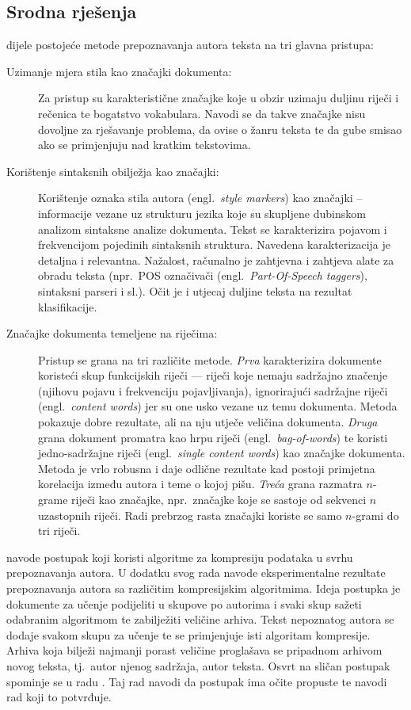 \documentclass[11pt,english]{article}
\newcommand{\engl}[1]{(engl.~\emph{#1})}
\begin{document}
\begin{multicols}{2}
\section{Srodna rješenja}
\citet{coyotl2006authorship} dijele postojeće metode prepoznavanja autora
teksta na tri glavna pristupa:
\begin{description}
\item[Uzimanje mjera stila kao značajki dokumenta:] Za pristup su
karakteristične značajke koje u obzir uzimaju duljinu riječi i rečenica te
bogatstvo vokabulara. Navodi se da takve značajke nisu dovoljne za rješavanje
problema, da ovise o žanru teksta te da gube smisao ako se primjenjuju nad
kratkim tekstovima.
\item[Korištenje sintaksnih obilježja kao značajki:] Korištenje oznaka stila
autora \engl{style markers} kao značajki -- informacije vezane uz strukturu
jezika koje su skupljene dubinskom analizom sintaksne analize dokumenta. Tekst se
karakterizira pojavom i frekvencijom pojedinih sintaksnih struktura. Navedena
karakterizacija je detaljna i relevantna. Nažalost, računalno je zahtjevna i
zahtjeva alate za obradu teksta (npr.~POS označivači \engl{Part-Of-Speech taggers},
sintaksni parseri i sl.). Očit je i utjecaj duljine teksta na rezultat klasifikacije.
\item[Značajke dokumenta temeljene na riječima:] Pristup se grana na tri
različite metode. \emph{Prva} karakterizira dokumente koristeći skup funkcijskih
riječi --- riječi koje nemaju sadržajno značenje (njihovu pojavu i
frekvenciju pojavljivanja), ignorirajući sadržajne riječi \engl{content words}
jer su one usko vezane uz temu dokumenta. Metoda pokazuje dobre rezultate, ali na
nju utječe veličina dokumenta. \emph{Druga} grana dokument promatra kao hrpu
riječi \engl{bag-of-words} te koristi jedno-sadržajne riječi \engl{single
content words} kao značajke dokumenta. Metoda je vrlo robusna i daje odlične rezultate
kad postoji primjetna korelacija između autora i teme o kojoj pišu. \emph{Treća}
grana razmatra $n$-grame riječi kao značajke, npr.~značajke koje se sastoje od
sekvenci $n$ uzastopnih riječi. Radi prebrzog rasta značajki koriste se samo
$n$-grami do tri riječi.
\end{description}

\citet{kukushkina2001using} navode postupak koji koristi algoritme za kompresiju
podataka u svrhu prepoznavanja autora. U dodatku svog rada navode eksperimentalne
rezultate prepoznavanja autora sa različitim kompresijskim algoritmima. Ideja
postupka je dokumente za učenje podijeliti u skupove po autorima i svaki skup
sažeti odabranim algoritmom te zabilježiti veličine arhiva. Tekst nepoznatog
autora se dodaje svakom skupu za učenje te se primjenjuje isti algoritam
kompresije. Arhiva koja bilježi najmanji porast veličine proglašava se
pripadnom arhivom novog teksta, tj.~autor njenog sadržaja, autor teksta. Osvrt
na sličan postupak spominje se u radu \citep{zhao2005effective}. Taj rad navodi
da postupak ima očite propuste te navodi rad koji to potvrđuje.


\end{multicols}
\end{document}
